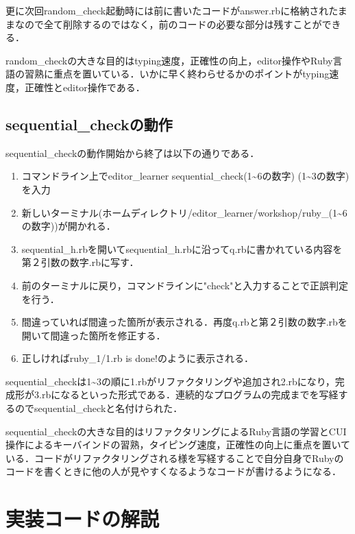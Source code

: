 \documentclass[11pt,dvipdfmx]{jsarticle}
\providecommand{\tightlist}{%
      \setlength{\itemsep}{0pt}\setlength{\parskip}{0pt}}
\begin{document}
更に次回random\_check起動時には前に書いたコードがanswer.rbに格納されたままなので全て削除するのではなく，前のコードの必要な部分は残すことができる．

random\_checkの大きな目的はtyping速度，正確性の向上，editor操作やRuby言語の習熟に重点を置いている．いかに早く終わらせるかのポイントがtyping速度，正確性とeditor操作である．

    \subsection{sequential\_checkの動作}\label{sequential_checkux306eux52d5ux4f5c}

    sequential\_checkの動作開始から終了は以下の通りである．

\begin{enumerate}
\def\labelenumi{\arabic{enumi}.}
\tightlist
\item
  コマンドライン上でeditor\_learner
  sequential\_check(1\textasciitilde{}6の数字)
  (1\textasciitilde{}3の数字)を入力
\item
  新しいターミナル(ホームディレクトリ/editor\_learner/workshop/ruby\_(1\textasciitilde{}6の数字))が開かれる．
\item
  sequential\_h.rbを開いてsequential\_h.rbに沿ってq.rbに書かれている内容を第２引数の数字.rbに写す．
\item
  前のターミナルに戻り，コマンドラインに"check"と入力することで正誤判定を行う．
\item
  間違っていれば間違った箇所が表示される．再度q.rbと第２引数の数字.rbを開いて間違った箇所を修正する．
\item
  正しければruby\_1/1.rb is done!のように表示される．
\end{enumerate}

sequential\_checkは1\textasciitilde{}3の順に1.rbがリファクタリングや追加され2.rbになり，完成形が3.rbになるといった形式である．連続的なプログラムの完成までを写経するのでsequential\_checkと名付けられた．

sequential\_checkの大きな目的はリファクタリングによるRuby言語の学習とCUI操作によるキーバインドの習熟，タイピング速度，正確性の向上に重点を置いている．コードがリファクタリングされる様を写経することで自分自身でRubyのコードを書くときに他の人が見やすくなるようなコードが書けるようになる．

    \section{実装コードの解説}\label{ux5b9fux88c5ux30b3ux30fcux30c9ux306eux89e3ux8aac}
\end{document}
